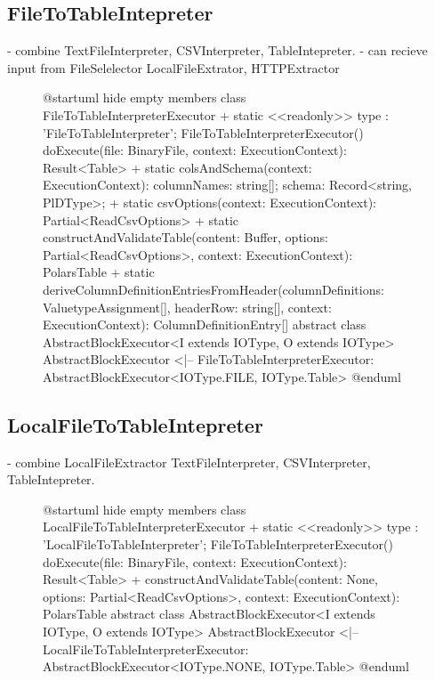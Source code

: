 \subsection{FileToTableIntepreter}
- combine TextFileInterpreter, CSVInterpreter, TableIntepreter.
- can recieve input from FileSelelector %
LocalFileExtrator, HTTPExtractor
\begin{figure}
	\begin{plantuml}
		@startuml
		hide empty members
		class FileToTableInterpreterExecutor {
		+ {static} <<readonly>> type : 'FileToTableInterpreter';
		FileToTableInterpreterExecutor()
		doExecute(file: BinaryFile, context: ExecutionContext): Result<Table>
		+ {static} colsAndSchema(context: ExecutionContext): { columnNames: string[]; schema: Record<string, PlDType>;}
		+ {static} csvOptions(context: ExecutionContext): Partial<ReadCsvOptions>
		+ {static} constructAndValidateTable(content: Buffer, options: Partial<ReadCsvOptions>, context: ExecutionContext): PolarsTable
		+ {static} deriveColumnDefinitionEntriesFromHeader(columnDefinitions: ValuetypeAssignment[], headerRow: string[], context: ExecutionContext): ColumnDefinitionEntry[]
		}
		abstract class AbstractBlockExecutor<I extends IOType, O extends IOType>
		AbstractBlockExecutor <|-- FileToTableInterpreterExecutor: AbstractBlockExecutor<IOType.FILE, IOType.Table>
		@enduml
	\end{plantuml}
	\caption{}\label{fig:uml:filetotableinterpreter}
\end{figure}

\subsection{LocalFileToTableIntepreter}
- combine LocalFileExtractor TextFileInterpreter, CSVInterpreter, TableIntepreter.
\begin{figure}
	\begin{plantuml}
		@startuml
		hide empty members
		class LocalFileToTableInterpreterExecutor {
		+ {static} <<readonly>> type : 'LocalFileToTableInterpreter';
		FileToTableInterpreterExecutor()
		doExecute(file: BinaryFile, context: ExecutionContext): Result<Table>
		+ constructAndValidateTable(content: None, options: Partial<ReadCsvOptions>, context: ExecutionContext): PolarsTable
		}
		abstract class AbstractBlockExecutor<I extends IOType, O extends IOType>
		AbstractBlockExecutor <|-- LocalFileToTableInterpreterExecutor: AbstractBlockExecutor<IOType.NONE, IOType.Table>
		@enduml
	\end{plantuml}
	\caption{}\label{fig:uml:localfiletotableinterpreter}
\end{figure}

